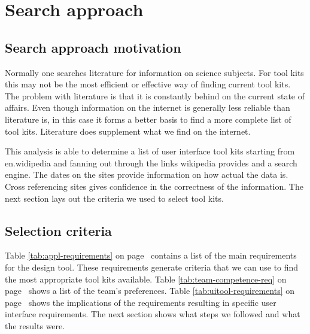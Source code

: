 \section{Search approach}

\subsection{Search approach motivation}

Normally one searches literature for information on science subjects.  For tool
kits this may not be the most efficient or effective way of finding current
tool kits. The problem with literature is that it is constantly behind on the
current state of affairs. Even though information on the internet is generally
less reliable than literature is, in this case it forms a better basis to find
a more complete list of tool kits. Literature does supplement what we find on
the internet.

This analysis is able to determine a list of user interface tool kits starting
from en.widipedia and fanning out through the links wikipedia provides and a
search engine. The dates on the sites provide information on how actual the
data is. Cross referencing sites gives confidence in the correctness of the
information. The next section lays out the criteria we used to select tool
kits.

\subsection{Selection criteria}

Table \ref{tab:appl-requirements} on page~\pageref{tab:appl-requirements}
contains a list of the main requirements for the design tool. These
requirements generate criteria that we can use to find the most appropriate
tool kits available.  Table \ref{tab:team-competence-req} on
page~\pageref{tab:team-competence-req} shows a list of the team's preferences.
Table \ref{tab:uitool-requirements} on page~\pageref{tab:uitool-requirements}
shows the implications of the requirements resulting in specific user interface
requirements. The next section shows what steps we followed and what the
results were.

